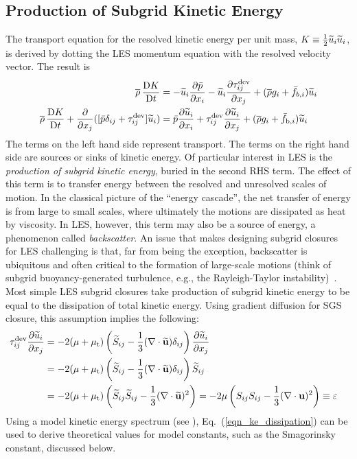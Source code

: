 \subsection{Production of Subgrid Kinetic Energy}

The transport equation for the resolved kinetic energy per unit mass, $K\equiv \mbox{$\frac{1}{2}$} \widetilde{u}_i\widetilde{u}_i$, is derived by dotting the LES momentum equation with the resolved velocity vector.  The result is
\begin{align}
\label{eqn_LES_KE}
\overline{\rho} \,\frac{\mathrm{D} K}{\mathrm{D} t} &= -\widetilde{u}_i\frac{\partial \bar{p}}{\partial x_i} - \widetilde{u}_i\frac{\partial \tau_{ij}^{\rm dev}}{\partial x_j} + (\overline{\rho} g_i + \bar{f}_{b,i}) \widetilde{u}_i \notag \\
\overline{\rho} \,\frac{\mathrm{D} K}{\mathrm{D} t} + \frac{\partial}{\partial x_j} ([\bar{p}\delta_{ij} + \tau_{ij}^{\rm dev}]\widetilde{u}_i) &=  \bar{p} \frac{\partial \widetilde{u}_i}{\partial x_i} + \tau_{ij}^{\rm dev}\frac{\partial \widetilde{u}_i}{\partial x_j} + (\overline{\rho} g_i + \bar{f}_{{\rm b},i}) \widetilde{u}_i
\end{align}
The terms on the left hand side represent transport.  The terms on the right hand side are sources or sinks of kinetic energy.  Of particular interest in LES is the \emph{production of subgrid kinetic energy}, buried in the second RHS term.  The effect of this term is to transfer energy between the resolved and unresolved scales of motion.  In the classical picture of the ``energy cascade'', the net transfer of energy is from large to small scales, where ultimately the motions are dissipated as heat by viscosity.  In LES, however, this term may also be a source of energy, a phenomenon called \emph{backscatter}.  An issue that makes designing subgrid closures for LES challenging is that, far from being the exception, backscatter is ubiquitous and often critical to the formation of large-scale motions (think of subgrid buoyancy-generated turbulence, e.g., the Rayleigh-Taylor instability)~\cite{Piomelli:1991}. 
Most simple LES subgrid closures take production of subgrid kinetic energy to be equal to the dissipation of total kinetic energy.  Using gradient diffusion for SGS closure, this assumption implies the following:
\begin{align}
\label{eqn_ke_dissipation}
\tau_{ij}^{\rm dev}\frac{\partial \widetilde{u}_i}{\partial x_j} &= - 2 (\mu + \mu_{\rm t}) \left(\widetilde{S}_{ij} - \frac{1}{3}(\nabla\cdot \widetilde{\mathbf{u}}) \delta_{ij} \right) \frac{\partial \widetilde{u}_i}{\partial x_j} && \notag\\
&= - 2 (\mu + \mu_{\rm t}) \left(\widetilde{S}_{ij} - \frac{1}{3}(\nabla\cdot \widetilde{\mathbf{u}}) \delta_{ij} \right) \widetilde{S}_{ij} && \notag \\
&= - 2 (\mu + \mu_{\rm t}) \left(\widetilde{S}_{ij}\widetilde{S}_{ij} - \frac{1}{3}(\nabla\cdot \widetilde{\mathbf{u}})^2 \right) = -2\mu \left(S_{ij}S_{ij} - \frac{1}{3}(\nabla\cdot \mathbf{u})^2 \right) \equiv \varepsilon
\end{align}
Using a model kinetic energy spectrum (see \cite{Pope:2000}), Eq.~(\ref{eqn_ke_dissipation}) can be used to derive theoretical values for model constants, such as the Smagorinsky constant, discussed below.


